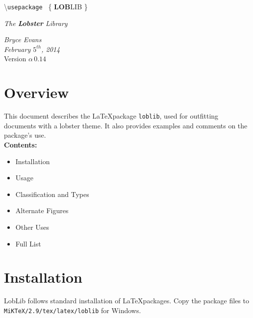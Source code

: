 \documentclass[11pt]{article}
\begin{document}
\vspace*{-3cm}			
\hspace*{-0.5cm}		

\vspace*{-2cm}

\Large \hspace{5em} {\color{darkgrey}\textbackslash \texttt{usepackage
}}
\Huge \{ \textbf{LOB}LIB \}

		\begin{center}
\hspace{7em} \huge \textit{{\color{crimson} The \textbf{Lobster} Library}}
\end{center}


\normalsize


\textit{Bryce Evans} \\
\textit{February $5^{th}$, 2014}\\
Version $\alpha\, 0.14$ \\

\section*{Overview}

This document describes the \LaTeX package \texttt{loblib}, used for outfitting documents with a lobster theme. It also provides examples and comments on the package's use. \\


\textbf{Contents:}
\begin{itemize} \itemsep-0em 
\item Installation
\item Usage
\item Classification and Types
\item Alternate Figures
\item Other Uses
\item Full List
\end{itemize}

\vspace*{-3.5cm}
\hspace*{7.5cm} 
 \hfill
\vspace*{-1.5cm} 

\section*{Installation}
LobLib follows standard installation of \LaTeX packages.
Copy the package files to\\ \texttt{MiKTeX/2.9/tex/latex/loblib} for Windows.\\
\end{document}
